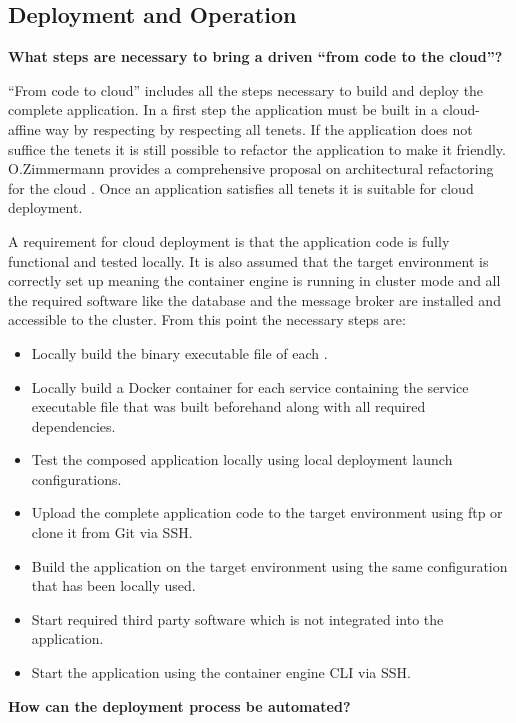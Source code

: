 \newpage
\subsection{Deployment and Operation}

\noindent
\textbf{What steps are necessary to bring a \ms{} driven \og{} ``from code to
the cloud''?}

``From code to cloud'' includes all the steps necessary to build and deploy the
complete \ms{} \og{} application. In a first step the application must be built
in a cloud-affine way by respecting by respecting all \ms{} tenets. If the
application does not suffice the tenets it is still possible to refactor the
application to make it \ms{} friendly. O.Zimmermann provides a comprehensive
proposal on architectural refactoring for the cloud
\cite{zimmermann2017architectural}. Once an application satisfies all tenets it
is suitable for cloud deployment.

A requirement for cloud deployment is that the application code is fully
functional and tested locally. It is also assumed that the target environment is
correctly set up meaning the container engine is running in cluster mode and all
the required software like the database and the message broker are installed and
accessible to the cluster. From this point the necessary steps are:

\begin{itemize}
  \item Locally build the binary executable file of each \ms{}.
  \item Locally build a Docker container for each service containing the service
  executable file that was built beforehand along with all required dependencies.
  \item Test the composed application locally using local deployment launch
  configurations.
  \item Upload the complete application code to the target environment using ftp
  or clone it from Git via SSH.
  \item Build the application on the target environment using the same
  configuration that has been locally used.
  \item Start required third party software which is not integrated into the
  application.
  \item Start the application using the container engine CLI via SSH.
\end{itemize}

\noindent
\textbf{How can the deployment process be automated?}

